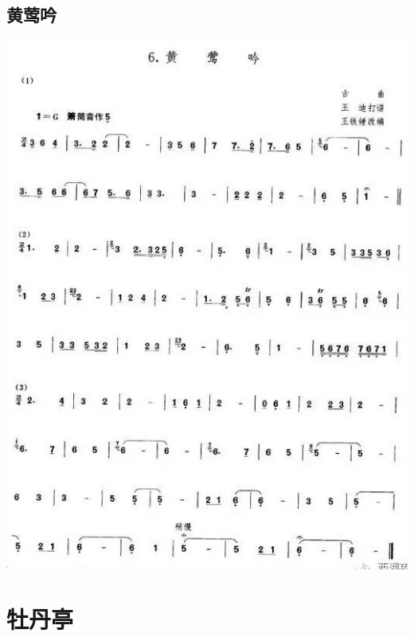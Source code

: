 \documentclass[cn,pad,twocol]{elegantbook}
\begin{document}
\section{黄莺吟}\includegraphics[width=\textwidth]{dongxiao/20200819/黄莺吟.jpeg}

\chapter{牡丹亭}
\end{document}
